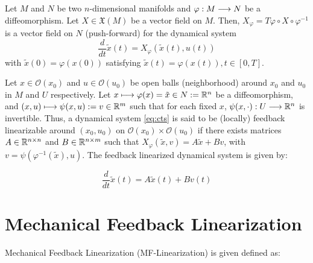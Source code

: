 \begin{defn}
    Let $M$ and $N$ be two $n$-dimensional manifolds and $\varphi: M \lra N$ be a diffeomorphism. Let $X \in \mathfrak{X}(M)$ be a vector field on $M$. Then, $X_{\varphi} = T\varphi \circ X \circ \varphi^{-1}$ is a vector field on $N$ (push-forward) for the dynamical system
    \begin{equation}
        \dfrac{d}{dt}\tilde{x}(t) = X_{\varphi}(\tilde{x}(t), u(t))
    \end{equation}
    with $\tilde{x}(0) = \varphi(x(0))$ satisfying $\tilde{x}(t) = \varphi(x(t)), t \in [0,T]$.

    Let $x \in \mathcal{O}(x_0)$ and $u \in \mathcal{O}(u_0)$ be open balls (neighborhood) around $x_0$ and $u_0$ in $M$ and $U$ respectively. Let $x \mapsto \varphi(x) = \tilde{x} \in N : = \R[n]$ be a diffeomorphism, and $(x,u) \mapsto \psi(x,u) : = v \in \R[m]$ such that for each fixed $x$, $\psi(x, \cdot) : U \lra \R[n]$ is invertible. Thus, a dynamical system \eqref{eq:cts} is said to be (locally) feedback linearizable around $(x_0, u_0)$ on $\mathcal{O}(x_0) \times \mathcal{O}(u_0)$ if there exists matrices $A \in \R[n \times n]$ and $B \in \R[n \times m]$ such that $X_{\varphi}(\tilde{x}, v) = A \tilde{x} + Bv$, with $v = \psi(\varphi^{-1}(\tilde{x}), u)$. The feedback linearized dynamical system is given by:

    \begin{equation}
        \dfrac{d}{dt}\tilde{x}(t) = A \tilde{x}(t) + B v(t)
    \end{equation}
\end{defn}



\section{Mechanical Feedback Linearization}
Mechanical Feedback Linearization (MF-Linearization) is given defined as:

